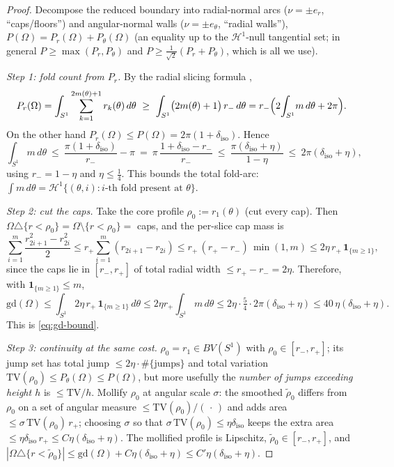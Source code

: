 \documentclass[11pt]{article}
\theoremstyle{definition}
\newcommand{\Om}{\Omega}
\newcommand{\HH}{\mathcal H}
\newcommand{\diso}{\delta_{\mathrm{iso}}}
\newcommand{\gd}{\mathrm{gd}}
\newcommand{\abs}[1]{\left|#1\right|}
\begin{document}
\begin{proof}
Decompose the reduced boundary into radial-normal arcs ($\nu=\pm e_r$,
``caps/floors'') and angular-normal walls ($\nu=\pm e_\theta$, ``radial
walls''), $P(\Om)=P_r(\Om)+P_\theta(\Om)$ (an equality up to the
$\HH^1$-null tangential set; in general $P\ge\max(P_r,P_\theta)$ and
$P\ge\tfrac1{\sqrt2}(P_r+P_\theta)$, which is all we use).

\emph{Step 1: fold count from $P_r$.} By the radial slicing formula
\cite[Thm.~3.103]{AFP},
\[
   P_r(\Om)=\int_{S^1}\sum_{k=1}^{2m(\theta)+1}r_k(\theta)\,d\theta
   \ \ge\ \int_{S^1}\bigl(2m(\theta)+1\bigr)\,r_-\,d\theta
   = r_-\Bigl(2\!\int_{S^1}\!m\,d\theta+2\pi\Bigr).
\]
On the other hand $P_r(\Om)\le P(\Om)=2\pi(1+\diso)$. Hence
\begin{equation}\label{eq:foldcount}
   \int_{S^1}m\,d\theta\ \le\ \frac{\pi(1+\diso)}{r_-}-\pi
   \ =\ \pi\,\frac{1+\diso-r_-}{r_-}\ \le\ \frac{\pi(\diso+\eta)}{1-\eta}
   \ \le\ 2\pi(\diso+\eta),
\end{equation}
using $r_-=1-\eta$ and $\eta\le\frac14$. This bounds the total fold-arc:
$\int m\,d\theta=\HH^1\{(\theta,i):\text{$i$-th fold present at $\theta$}\}$.

\emph{Step 2: cut the caps.} Take the core profile $\rho_0:=r_1(\theta)$
(cut every cap). Then $\Om\triangle\{r<\rho_0\}=\Om\setminus\{r<\rho_0\}=$
caps, and the per-slice cap mass is
\[
   \sum_{i=1}^{m}\frac{r_{2i+1}^2-r_{2i}^2}{2}
   \le r_+\sum_{i=1}^m (r_{2i+1}-r_{2i})
   \le r_+\,(r_+-r_-)\,\min(1,m)
   \le 2\eta\,r_+\,\mathbf 1_{\{m\ge1\}} ,
\]
since the caps lie in $[r_-,r_+]$ of total radial width $\le r_+-r_-=2\eta$.
Therefore, with $\mathbf 1_{\{m\ge1\}}\le m$,
\begin{equation}\label{eq:gd-core}
   \gd(\Om)\le\int_{S^1}2\eta\,r_+\,\mathbf 1_{\{m\ge1\}}\,d\theta
   \le 2\eta r_+\!\int_{S^1}\!m\,d\theta
   \le 2\eta\cdot\tfrac54\cdot 2\pi(\diso+\eta)
   \le 40\,\eta(\diso+\eta).
\end{equation}
This is \eqref{eq:gd-bound}.

\emph{Step 3: continuity at the same cost.} $\rho_0=r_1\in BV(S^1)$ with
$\rho_0\in[r_-,r_+]$; its jump set has total jump
$\le 2\eta\cdot\#\{\text{jumps}\}$ and total variation
$\mathrm{TV}(\rho_0)\le P_\theta(\Om)\le P(\Om)$, but more usefully the
\emph{number of jumps exceeding height $h$} is $\le \mathrm{TV}/h$.
Mollify $\rho_0$ at angular scale $\sigma$: the smoothed
$\widetilde\rho_0$ differs from $\rho_0$ on a set of angular measure
$\le \mathrm{TV}(\rho_0)/(\,\cdot\,)$ and adds area
$\le\sigma\,\mathrm{TV}(\rho_0)\,r_+$; choosing $\sigma$ so that
$\sigma\,\mathrm{TV}(\rho_0)\le\eta\diso$ keeps the extra area
$\le\eta\diso\,r_+\le C\eta(\diso+\eta)$. The mollified profile is
Lipschitz, $\widetilde\rho_0\in[r_-,r_+]$, and
$\abs{\Om\triangle\{r<\widetilde\rho_0\}}\le\gd(\Om)+C\eta(\diso+\eta)\le
C'\eta(\diso+\eta)$.
\end{proof}
\end{document}

